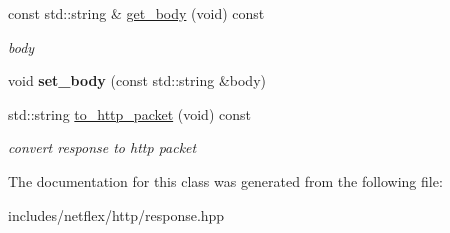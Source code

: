 \begin{DoxyCompactItemize}
const std\+::string \& \hyperlink{classnetflex_1_1http_1_1response_a13222bdab2d580652cec32177fbfaa0e}{get\+\_\+body} (void) const
\begin{DoxyCompactList}\small\item\em body \end{DoxyCompactList}\item 
\mbox{\label{classnetflex_1_1http_1_1response_adc5c33e406d082e71d9803433136a685}} 
void {\bfseries set\+\_\+body} (const std\+::string \&body)
\item 
\mbox{\label{classnetflex_1_1http_1_1response_a5e6e4e483bee30dacbe6b6685201ddd0}} 
std\+::string \hyperlink{classnetflex_1_1http_1_1response_a5e6e4e483bee30dacbe6b6685201ddd0}{to\+\_\+http\+\_\+packet} (void) const
\begin{DoxyCompactList}\small\item\em convert response to http packet \end{DoxyCompactList}\end{DoxyCompactItemize}


The documentation for this class was generated from the following file\+:\begin{DoxyCompactItemize}
\item 
includes/netflex/http/response.\+hpp\end{DoxyCompactItemize}
